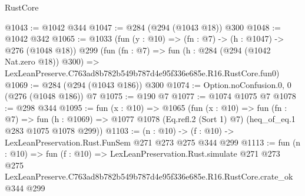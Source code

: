 \begin{lexlean}{RustCore}
\begin{coremodule}
@1043 := @1042 @344
@1047 := @284 (@294 (@1043 @18)) @300
@1048 := @1042 @342
@1065 := @1033
    (fun (y : @10) => (fn : @7) -> (h : @1047) -> @276 (@1048 @18))
    @299
    (fun (fn : @7) =>
    fun (h : @284 (@294 (@1042 Nat.zero @18)) @300) =>
    LexLeanPreserve.C763ad8b782b549b787d4e95f336e685e.R16.RustCore.fun0)
@1069 := @284 (@294 (@1043 @186)) @300
@1074 := Option.noConfusion.{0, 0} (@276 (@1048 @186)) @7
@1075 := @190 @7
@1077 := @1074 @1075 @7
@1078 := @298 @344
@1095 := fun (x : @10) =>
  @1065
    (fun (x : @10) =>
    fun (fn : @7) =>
    fun (h : @1069) => @1077 @1078 (Eq.refl.{2} (Sort 1) @7) (heq_of_eq.{1} @283 @1075 @1078 @299))
@1103 := (n : @10) -> (f : @10) -> LexLeanPreservation.Rust.FunSem @271 @273 @275 @344 @299
@1113 := fun (n : @10) =>
  fun (f : @10) =>
  LexLeanPreservation.Rust.simulate
    @271
    @273
    @275
    LexLeanPreserve.C763ad8b782b549b787d4e95f336e685e.R16.RustCore.crate_ok
    @344
    @299
\end{coremodule}
\end{lexlean}
